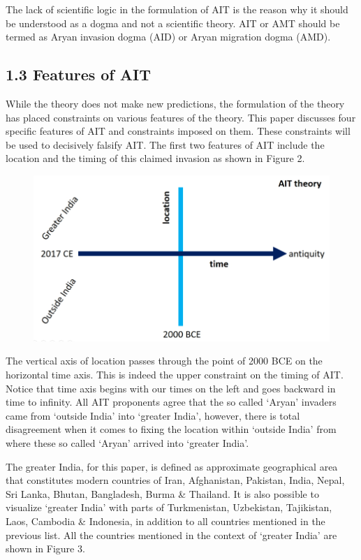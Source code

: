 The lack of scientific logic in the formulation of AIT is the reason why it should be understood as a dogma and not a scientific theory. AIT or AMT should be termed as Aryan invasion dogma (AID) or Aryan migration dogma (AMD).


\subsection*{1.3 Features of AIT}

While the theory does not make new predictions, the formulation of the theory has placed constraints on various features of the theory. This paper discusses four specific features of AIT and constraints imposed on them. These constraints will be used to decisively falsify AIT. The first two features of AIT include the location and the timing of this claimed invasion as shown in Figure 2.

\begin{figure}[!htbp]
\includegraphics[scale=0.25]{images/8-02.jpg}
\caption{}\label{art8-fig02}
\end{figure}

The vertical axis of location passes through the point of 2000 BCE on the horizontal time axis. This is indeed the upper constraint on the timing of AIT. Notice that time axis begins with our times on the left and goes backward in time to infinity. All AIT proponents agree that the so called ‘Aryan’ invaders came from ‘outside India’ into ‘greater India’, however, there is total disagreement when it comes to fixing the location within ‘outside India’ from where these so called ‘Aryan’ arrived into ‘greater India’.

The greater India, for this paper, is defined as approximate geographical area that constitutes modern countries of Iran, Afghanistan, Pakistan, India, Nepal, Sri Lanka, Bhutan, Bangladesh, Burma \& Thailand. It is also possible to visualize ‘greater India’ with parts of Turkmenistan, Uzbekistan, Tajikistan, Laos, Cambodia \& Indonesia, in addition to all countries mentioned in the previous list. All the countries mentioned in the context of ‘greater India’ are shown in Figure 3.

